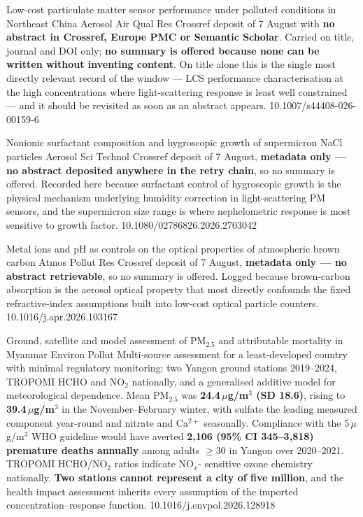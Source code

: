 \documentclass[10pt]{article}
\begin{document}
{Low-cost particulate matter sensor performance under polluted conditions in Northeast China}
{Aerosol Air Qual Res}
{Crossref deposit of 7 August with \textbf{no abstract in Crossref, Europe PMC or Semantic
Scholar}. Carried on title, journal and DOI only; \textbf{no summary is offered because
none can be written without inventing content}. On title alone this is the single most
directly relevant record of the window --- LCS performance characterisation at the high
concentrations where light-scattering response is least well constrained --- and it should
be revisited as soon as an abstract appears.}
{10.1007/s44408-026-00159-6}

{Nonionic surfactant composition and hygroscopic growth of supermicron NaCl particles}
{Aerosol Sci Technol}
{Crossref deposit of 7 August, \textbf{metadata only --- no abstract deposited anywhere in
the retry chain}, so no summary is offered. Recorded here because surfactant control of
hygroscopic growth is the physical mechanism underlying humidity correction in
light-scattering PM sensors, and the supermicron size range is where nephelometric
response is most sensitive to growth factor.}
{10.1080/02786826.2026.2703042}

{Metal ions and pH as controls on the optical properties of atmospheric brown carbon}
{Atmos Pollut Res}
{Crossref deposit of 7 August, \textbf{metadata only --- no abstract retrievable}, so no
summary is offered. Logged because brown-carbon absorption is the aerosol optical property
that most directly confounds the fixed refractive-index assumptions built into low-cost
optical particle counters.}
{10.1016/j.apr.2026.103167}


{Ground, satellite and model assessment of PM$_{2.5}$ and attributable mortality in Myanmar}
{Environ Pollut}
{Multi-source assessment for a least-developed country with minimal regulatory monitoring:
two Yangon ground stations 2019--2024, TROPOMI HCHO and NO$_2$ nationally, and a
generalised additive model for meteorological dependence. Mean PM$_{2.5}$ was
\textbf{24.4\,$\mu$g/m$^3$ (SD 18.6)}, rising to \textbf{39.4\,$\mu$g/m$^3$} in the
November--February winter, with sulfate the leading measured component year-round and
nitrate and Ca$^{2+}$ seasonally. Compliance with the 5\,$\mu$g/m$^3$ WHO guideline would
have averted \textbf{2{,}106 (95\% CI 345--3{,}818) premature deaths annually} among
adults $\geq$30 in Yangon over 2020--2021. TROPOMI HCHO/NO$_2$ ratios indicate NO$_x$-
sensitive ozone chemistry nationally. \textbf{Two stations cannot represent a city of five
million}, and the health impact assessment inherits every assumption of the imported
concentration--response function.}
{10.1016/j.envpol.2026.128918}
\end{document}
